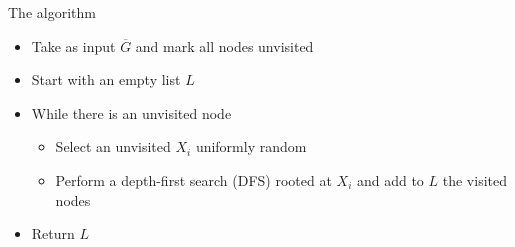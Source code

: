 	\begin{frame}
		\begin{block}{The algorithm}
			\begin{itemize}
				\item Take as input $\overline G$ and mark all nodes unvisited
				\item Start with an empty list $L$
				\item While there is an unvisited node
				\begin{itemize}
					\item Select an unvisited $X_i$ uniformly random
					\item Perform a depth-first search (DFS) rooted at $X_i$ and add to $L$ the visited nodes
				\end{itemize}
				\item Return $L$
			\end{itemize}
		\end{block}
	\end{frame}

